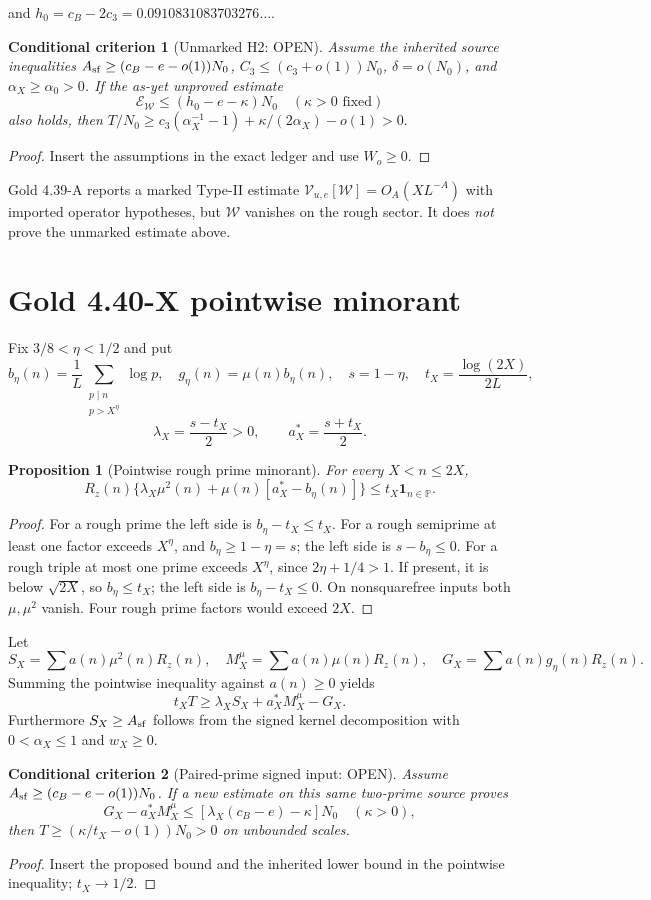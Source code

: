 \documentclass[11pt]{article}
\newtheorem{proposition}{Proposition}
\newtheorem{criterion}{Conditional criterion}
\begin{document}
and \(h_0=c_B-2c_3=0.0910831083703276\ldots\).
\begin{criterion}[Unmarked H2: OPEN]
Assume the inherited source inequalities
\(A_{\rm sf}\ge(c_B-e-o(1))N_0\),
\(C_3\le(c_3+o(1))N_0\), \(\delta=o(N_0)\),
and \(\alpha_X\ge\alpha_0>0\).
If the as-yet \emph{unproved} estimate
\[
\mathcal E_{\mathcal W}\le(h_0-e-\kappa)N_0
\quad(\kappa>0\text{ fixed})
\]
also holds, then
\(
T/N_0\ge c_3(\alpha_X^{-1}-1)+\kappa/(2\alpha_X)-o(1)>0.
\)
\end{criterion}
\begin{proof}
Insert the assumptions in the exact ledger and use \(W_o\ge0\).
\end{proof}
Gold 4.39-A reports a marked Type-II estimate
\(\mathscr V_{u,e}[\mathcal W]=O_A(XL^{-A})\) with imported operator
hypotheses, but \(\mathcal W\) vanishes on the rough sector.
It does \emph{not} prove the unmarked estimate above.
\section{Gold 4.40-X pointwise minorant}
Fix \(3/8<\eta<1/2\) and put
\[
b_\eta(n)=\frac1L\sum_{\substack{p\mid n\\p>X^\eta}}\log p,
\quad g_\eta(n)=\mu(n)b_\eta(n),\quad
s=1-\eta,\quad t_X=\frac{\log(2X)}{2L},
\]
\[
\lambda_X=\frac{s-t_X}{2}>0,\qquad
a_X^*=\frac{s+t_X}{2}.
\]
\begin{proposition}[Pointwise rough prime minorant]
For every \(X<n\le2X\),
\[
R_z(n)\{\lambda_X\mu^2(n)+\mu(n)[a_X^*-b_\eta(n)]\}
\le t_X\mathbf1_{n\in\mathbb P}.
\]
\end{proposition}
\begin{proof}
For a rough prime the left side is \(b_\eta-t_X\le t_X\).
For a rough semiprime at least one factor exceeds \(X^\eta\),
and \(b_\eta\ge1-\eta=s\); the left side is \(s-b_\eta\le0\).
For a rough triple at most one prime exceeds \(X^\eta\), since
\(2\eta+1/4>1\). If present, it is below \(\sqrt{2X}\),
so \(b_\eta\le t_X\); the left side is \(b_\eta-t_X\le0\).
On nonsquarefree inputs both \(\mu,\mu^2\) vanish.
Four rough prime factors would exceed \(2X\).
\end{proof}
Let
\[
S_X=\sum a(n)\mu^2(n)R_z(n),\quad
M_X^\mu=\sum a(n)\mu(n)R_z(n),\quad
G_X=\sum a(n)g_\eta(n)R_z(n).
\]
Summing the pointwise inequality against \(a(n)\ge0\) yields
\[
t_XT\ge\lambda_XS_X+a_X^*M_X^\mu-G_X.
\]
Furthermore \(S_X\ge A_{\rm sf}\) follows from the signed kernel
decomposition with \(0<\alpha_X\le1\) and \(w_X\ge0\).
\begin{criterion}[Paired-prime signed input: OPEN]
Assume \(A_{\rm sf}\ge(c_B-e-o(1))N_0\).
If a new estimate on this \emph{same two-prime source} proves
\[
G_X-a_X^*M_X^\mu
 \le[\lambda_X(c_B-e)-\kappa]N_0\quad(\kappa>0),
\]
then \(T\ge(\kappa/t_X-o(1))N_0>0\) on unbounded scales.
\end{criterion}
\begin{proof}
Insert the proposed bound and the inherited lower bound in the
pointwise inequality; \(t_X\to1/2\).
\end{proof}
\end{document}
